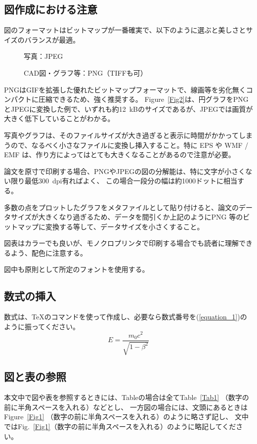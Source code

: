 \documentclass{PASJ2026}
\begin{document}
\subsection{図作成における注意}
%
\begin{Itemize}
%
\item 図のフォーマットはビットマップが一番確実で、以下のように選ぶと美しさとサイズのバランスが最適。
%
\begin{description}
\item[] 写真：JPEG
\item[] CAD図・グラフ等：PNG（TIFFも可）
\end{description}
%
\item PNGはGIFを拡張した優れたビットマップフォーマットで、線画等を劣化無くコンパクトに圧縮できるため、強く推奨する。
Figure~\ref{Fig2}は、円グラフをPNGとJPEGに変換した例で、いずれも約12~kBのサイズであるが、JPEGでは画質が大きく低下していることがわかる。
%
\item 写真やグラフは、そのファイルサイズが大き過ぎると表示に時間がかかってしまうので、なるべく小さなファイルに変換し挿入すること。特に EPS や WMF / EMF は、作り方によってはとても大きくなることがあるので注意が必要。
%
\item 論文を原寸で印刷する場合、PNGやJPEGの図の分解能は、特に文字が小さくない限り最低300~dpi有ればよく、
この場合一段分の幅は約1000ドットに相当する。
%
\item 多数の点をプロットしたグラフをメタファイルとして貼り付けると、論文のデータサイズが大きくなり過ぎるため、データを間引くか上記のようにPNG 等のビットマップに変換する等して、データサイズを小さくすること。
%
\item 図表はカラーでも良いが、モノクロプリンタで印刷する場合でも読者に理解できるよう、配色に注意する。
%
\item 図中も原則として所定のフォントを使用する。
%
\end{Itemize}
%
\subsection{数式の挿入}
数式は、{\TeX}のコマンドを使って作成し、必要なら数式番号を(\ref{equation_1})のように振ってください。
\begin{equation}
E = \frac{m_0 c^2}{\sqrt{1 - \beta^2}}
\label{equation_1}
\end{equation}
%
\subsection{図と表の参照}
本文中で図や表を参照するときには、Tableの場合は全てTable~\ref{Tab1}
（数字の前に半角スペースを入れる）などとし、
一方図の場合には、文頭にあるときはFigure~\ref{Fig1}
（数字の前に半角スペースを入れる）のように略さず記し、
文中ではFig.~\ref{Fig1}（数字の前に半角スペースを入れる）のように略記してください。
%
\end{document}

